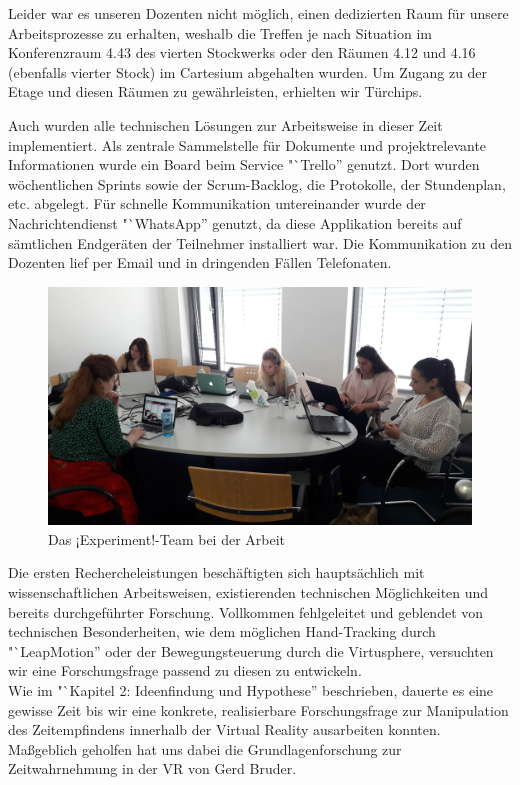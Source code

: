 \documentclass{Bericht}
\begin{document}
		Leider war es unseren Dozenten nicht möglich, einen dedizierten Raum für unsere Arbeitsprozesse zu erhalten, weshalb die Treffen je nach Situation im Konferenzraum 4.43 des vierten Stockwerks oder den Räumen 4.12 und 4.16 (ebenfalls vierter Stock) im Cartesium abgehalten wurden. Um Zugang zu der Etage und diesen Räumen zu gewährleisten, erhielten wir Türchips.

		Auch wurden alle technischen Lösungen zur Arbeitsweise in dieser Zeit implementiert. Als zentrale Sammelstelle für Dokumente und projektrelevante Informationen wurde ein Board beim Service "`Trello'' genutzt. Dort wurden wöchentlichen Sprints sowie der Scrum-Backlog, die Protokolle, der Stundenplan, etc. abgelegt. Für schnelle Kommunikation untereinander wurde der Nachrichtendienst "`WhatsApp'' genutzt, da diese Applikation bereits auf sämtlichen Endgeräten der Teilnehmer installiert war. Die Kommunikation zu den Dozenten lief per Email und in dringenden Fällen Telefonaten.
		
		\begin{figure}[H] %
			\centering
			\includegraphics[width=\linewidth, height=\textheight, keepaspectratio]{../Bilder/20170518_103125.jpg}
			\caption{Das ¡Experiment!-Team bei der Arbeit}
			\label{img:experiment-team-bei-der-arbeit}
		\end{figure}
		
		Die ersten Rechercheleistungen beschäftigten sich hauptsächlich mit wissenschaftlichen Arbeitsweisen, existierenden technischen Möglichkeiten und bereits durchgeführter Forschung. Vollkommen fehlgeleitet und geblendet von technischen Besonderheiten, wie dem möglichen Hand-Tracking durch "`LeapMotion'' oder der Bewegungsteuerung durch die Virtusphere, versuchten wir eine Forschungsfrage passend zu diesen zu entwickeln.\\
		Wie im "`Kapitel 2: Ideenfindung und Hypothese'' beschrieben, dauerte es eine gewisse Zeit bis wir eine konkrete, realisierbare Forschungsfrage zur Manipulation des Zeitempfindens innerhalb der Virtual Reality ausarbeiten konnten. Maßgeblich geholfen hat uns dabei die Grundlagenforschung zur Zeitwahrnehmung in der VR von Gerd Bruder.
\end{document}
